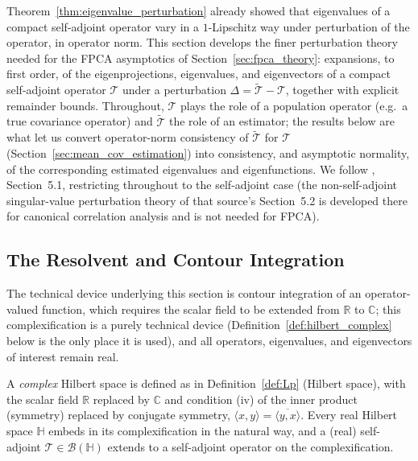 Theorem~\ref{thm:eigenvalue_perturbation} already showed that eigenvalues
of a compact self-adjoint operator vary in a $1$-Lipschitz way under
perturbation of the operator, in operator norm. This section develops the
finer perturbation theory needed for the FPCA asymptotics of
Section~\ref{sec:fpca_theory}: expansions, to first order, of the
eigenprojections, eigenvalues, and eigenvectors of a compact self-adjoint
operator $\mathcal{T}$ under a perturbation $\Delta = \widetilde{\mathcal{T}}
-\mathcal{T}$, together with explicit remainder bounds. Throughout,
$\mathcal{T}$ plays the role of a population operator (e.g.\ a true
covariance operator) and $\widetilde{\mathcal{T}}$ the role of an
estimator; the results below are what let us convert operator-norm
consistency of $\widetilde{\mathcal{T}}$ for $\mathcal{T}$
(Section~\ref{sec:mean_cov_estimation}) into consistency, and asymptotic
normality, of the corresponding estimated eigenvalues and eigenfunctions.
We follow \cite{hsingeubank2015}, Section~5.1, restricting throughout to
the self-adjoint case (the non-self-adjoint singular-value perturbation
theory of that source's Section~5.2 is developed there for canonical
correlation analysis and is not needed for FPCA).

\subsection{The Resolvent and Contour Integration}
\label{subsec:resolvent}

The technical device underlying this section is contour integration of an
operator-valued function, which requires the scalar field to be extended
from $\mathbb{R}$ to $\mathbb{C}$; this complexification is a purely
technical device (Definition~\ref{def:hilbert_complex} below is the only
place it is used), and all operators, eigenvalues, and eigenvectors of
interest remain real.

\begin{definition}
\label{def:hilbert_complex}
A \emph{complex} Hilbert space is defined as in Definition~\ref{def:Lp}
(Hilbert space), with the scalar field $\mathbb{R}$ replaced by
$\mathbb{C}$ and condition (iv) of the inner product (symmetry) replaced
by conjugate symmetry, $\langle x,y\rangle=\overline{\langle y,x\rangle}$.
Every real Hilbert space $\mathbb{H}$ embeds in its complexification in the
natural way, and a (real) self-adjoint $\mathcal{T}\in\mathcal{B}
(\mathbb{H})$ extends to a self-adjoint operator on the complexification.
\end{definition}

